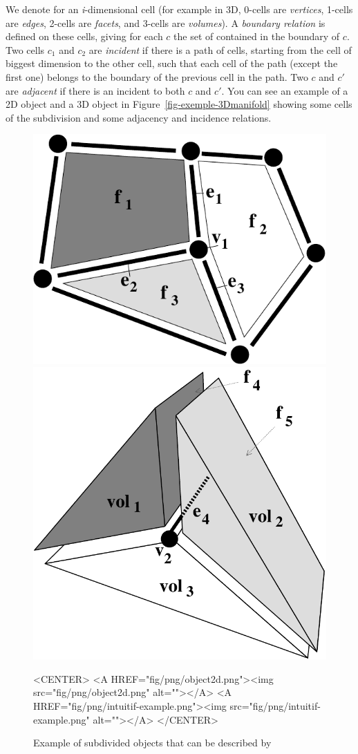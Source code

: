 We denote  for an \emph{i}-dimensional cell (for example in 3D,
0-cells are \emph{vertices}, 1-cells are \emph{edges}, 2-cells are
\emph{facets}, and 3-cells are \emph{volumes}). A \emph{boundary
  relation} is defined on these cells, giving for each  $c$
the set of  contained in the boundary of $c$.  Two cells
$c_1$ and $c_2$ are \emph{incident} if there is a path of cells,
starting from the cell of biggest dimension to the other cell, such
that each cell of the path (except the first one) belongs to the
boundary of the previous cell in the path. Two  $c$ and $c'$
are \emph{adjacent} if there is an  incident to both $c$
and $c'$.  You can see an example of a 2D object and a 3D object in
Figure~\ref{fig-exemple-3Dmanifold} showing some cells of the
subdivision and some adjacency and incidence relations.
\begin{figure}[ht]
  \begin{ccTexOnly}
    \begin{center}
      \includegraphics[width=.3\textwidth]
      {Combinatorial_map/fig/pdf/object2d}
      \qquad
      \includegraphics[width=.4\textwidth]
      {Combinatorial_map/fig/pdf/intuitif-example}
    \end{center}
  \end{ccTexOnly}
  \begin{ccHtmlOnly}
    <CENTER>
    <A HREF="fig/png/object2d.png"><img src="fig/png/object2d.png" alt=""></A>
    <A HREF="fig/png/intuitif-example.png"><img src="fig/png/intuitif-example.png" alt=""></A>
    </CENTER>
    \end{ccHtmlOnly}
    \caption{Example of subdivided objects that can be described by
}
\end{figure}
